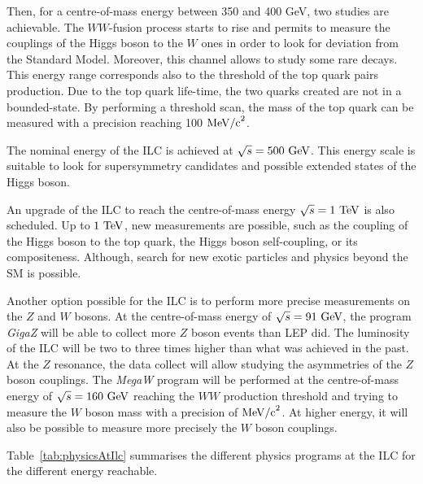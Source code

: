   Then, for a centre-of-mass energy between 350 and 400 GeV, two studies are achievable. 
  The $WW$-fusion process starts to rise and permits to measure the couplings of the Higgs boson to the $W$ ones in order to look for deviation from the Standard Model. 
  Moreover, this channel allows to study some rare decays. 
  This energy range corresponds also to the threshold of the top quark pairs production.
  Due to the top quark life-time, the two quarks created are not in a bounded-state.
  By performing a threshold scan, the mass of the top quark can be measured with a precision reaching 100 $\rm{MeV/c}^2$.

  The nominal energy of the \gls{ILC} is achieved at $\sqrt{s} = 500~\rm{GeV}$.
  This energy scale is suitable to look for supersymmetry candidates and possible extended states of the Higgs boson.

  An upgrade of the ILC to reach the centre-of-mass energy $\sqrt{s} = 1~\rm{TeV}$ is also scheduled.
  Up to $1~\rm{TeV}$, new measurements are possible, such as the coupling of the Higgs boson to the top quark, the Higgs boson self-coupling, or its compositeness.
  Although, search for new exotic particles and physics beyond the \gls{SM} is possible.

  Another option possible for the \gls{ILC} is to perform more precise measurements on the $Z$ and $W$ bosons.
  At the centre-of-mass energy of $\sqrt{s} = 91~\rm{GeV}$, the program \textit{GigaZ} will be able to collect more $Z$ boson events than \gls{LEP} did.
  The luminosity of the \gls{ILC} will be two to three times higher than what was achieved in the past.
  At the $Z$ resonance, the data collect will allow studying the asymmetries of the $Z$ boson couplings.
  The \textit{MegaW} program will be performed at the centre-of-mass energy of $\sqrt{s} = 160~\rm{GeV}$ reaching the $WW$ production threshold and trying to measure the $W$ boson mass with a precision of $\rm{MeV/c}^2$.
  At higher energy, it will also be possible to measure more precisely the $W$ boson couplings.
 
  Table~\ref{tab:physicsAtIlc} summarises the different physics programs at the \gls{ILC} for the different energy reachable.  

